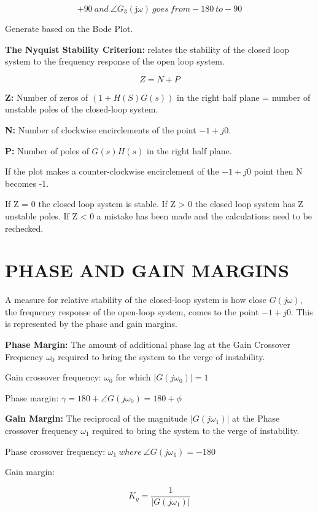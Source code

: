 \begin{multicols}{3}
\[+ 90\ and\ \angle G_{3}\left( \text{j}\omega \right)\ goes\ from - 180\ to - 90\]


Generate based on the Bode Plot.

\textbf{The Nyquist Stability Criterion:} relates the stability of the
closed loop system to the frequency response of the open loop system.

\[Z = N + P\]

\textbf{Z:} Number of zeros of $(1+H(S)G(s))$ in the right half plane =
number of unstable poles of the closed-loop system.

\textbf{N:} Number of clockwise encirclements of the point $-1+j0$.

\textbf{P:} Number of poles of $G(s)H(s)$ in the right half plane.

If the plot makes a counter-clockwise encirclement of the $-1+j0$ point
then N becomes -1.

If Z = 0 the closed loop system is stable. If Z \textgreater{} 0 the
closed loop system has Z unstable poles. If Z \textless{} 0 a mistake
has been made and the calculations need to be rechecked.

\section{PHASE AND GAIN MARGINS}

A measure for relative stability of the closed-loop system is how close
\(G(j\omega)\), the frequency response of the open-loop system, comes to
the point $-1+j0$. This is represented by the phase and gain margins.

\textbf{Phase Margin:} The amount of additional phase lag at the Gain
Crossover Frequency \(\omega_{0}\) required to bring the system to the
verge of instability.

Gain crossover frequency:
\(\omega_{0}\text{\ for\ which\ }\left| G\left( j\omega_{0} \right) \right| = 1\)

Phase margin:
\(\gamma = 180 + \angle G\left( j\omega_{0} \right) = 180 + \phi\)

\textbf{Gain Margin:} The reciprocal of the magnitude
\(\left| G(j\omega_{1}) \right|\) at the Phase crossover frequency
\(\omega_{1}\) required to bring the system to the verge of instability.

Phase crossover frequency:
\(\omega_{1}\ where\ \angle G\left( j\omega_{1} \right) = - 180\)

Gain margin:

\[K_{g} = \frac{1}{\left| G(j\omega_{1}) \right|}\]


\end{multicols}
